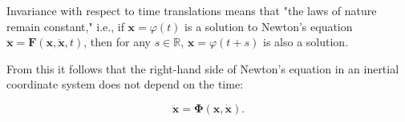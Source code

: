Invariance with respect to time translations means that "the laws of nature remain constant," i.e., if $\mathbf{x} = \varphi(t)$ is a solution to Newton's equation $\ddot{\mathbf{x}} = \mathbf{F}(\mathbf{x}, \dot{\mathbf{x}}, t)$, then for any $s \in \mathbb{R}$, $\mathbf{x} = \varphi(t + s)$ is also a solution.

From this it follows that the right-hand side of Newton's equation in an inertial coordinate system does not depend on the time:

$$\ddot{\mathbf{x}} = \boldsymbol{\Phi}(\mathbf{x}, \dot{\mathbf{x}}).$$
